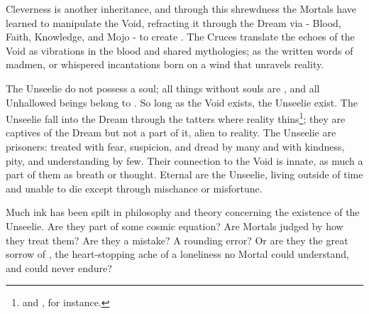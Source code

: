     Cleverness is another inheritance, and through this shrewdness the Mortals have learned to manipulate the Void, refracting it through the Dream via  - Blood, Faith, Knowledge, and Mojo - to create . The Cruces translate the echoes of the Void as vibrations in the blood and shared mythologies; as the written words of madmen, or whispered incantations born on a wind that unravels reality.

    The Unseelie do not possess a soul; all things without souls are , and all Unhallowed beings belong to . So long as the Void exists, the Unseelie exist. The Unseelie fall into the Dream through the tatters where reality thins\footnote{ and , for instance.}; they are captives of the Dream but not a part of it, alien to reality. The Unseelie are prisoners: treated with fear, suspicion, and dread by many and with kindness, pity, and understanding by few. Their connection to the Void is innate, as much a part of them as breath or thought. Eternal are the Unseelie, living outside of time and unable to die except through mischance or misfortune. 


Much ink has been spilt in philosophy and theory concerning the existence of the Unseelie. Are they part of some cosmic equation? Are Mortals judged by how they treat them? Are they a mistake? A rounding error? Or are they the great sorrow of \TheAuthority, the heart-stopping ache of a loneliness no Mortal could understand, and could never endure?
